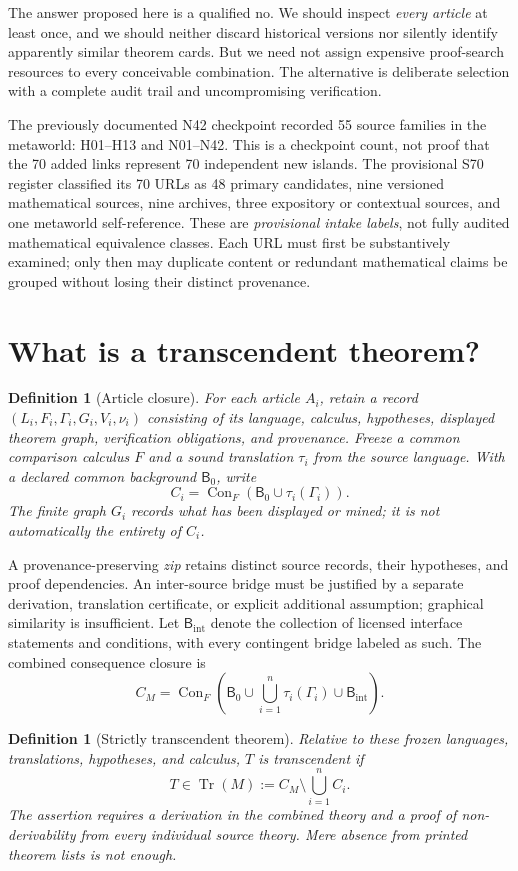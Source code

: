 \documentclass[11pt,letterpaper]{article}
\newtheorem{definition}[theorem]{Definition}
\newcommand{\Con}{\operatorname{Con}}
\newcommand{\Tr}{\operatorname{Tr}}
\newcommand{\B}{\mathsf{B}}
\begin{document}
The answer proposed here is a qualified no. We should inspect \emph{every article} at least once, and we should neither discard historical versions nor silently identify apparently similar theorem cards. But we need not assign expensive proof-search resources to every conceivable combination. The alternative is deliberate selection with a complete audit trail and uncompromising verification.

The previously documented N42 checkpoint recorded 55 source families in the metaworld: H01--H13 and N01--N42. This is a checkpoint count, not proof that the 70 added links represent 70 independent new islands. The provisional S70 register classified its 70 URLs as 48 primary candidates, nine versioned mathematical sources, nine archives, three expository or contextual sources, and one metaworld self-reference. These are \emph{provisional intake labels}, not fully audited mathematical equivalence classes. Each URL must first be substantively examined; only then may duplicate content or redundant mathematical claims be grouped without losing their distinct provenance.

\section{What is a transcendent theorem?}
\begin{definition}[Article closure]
For each article $A_i$, retain a record $(L_i,F_i,\Gamma_i,G_i,V_i,\nu_i)$ consisting of its language, calculus, hypotheses, displayed theorem graph, verification obligations, and provenance. Freeze a common comparison calculus $F$ and a sound translation $\tau_i$ from the source language. With a declared common background $\B_0$, write
\[
C_i=\Con_F(\B_0\cup\tau_i(\Gamma_i)).
\]
The finite graph $G_i$ records what has been displayed or mined; it is not automatically the entirety of $C_i$.
\end{definition}

A provenance-preserving \emph{zip} retains distinct source records, their hypotheses, and proof dependencies. An inter-source bridge must be justified by a separate derivation, translation certificate, or explicit additional assumption; graphical similarity is insufficient. Let $\B_{\mathrm{int}}$ denote the collection of licensed interface statements and conditions, with every contingent bridge labeled as such. The combined consequence closure is
\[
C_M=\Con_F\left(\B_0\cup\bigcup_{i=1}^n\tau_i(\Gamma_i)\cup\B_{\mathrm{int}}\right).
\]
\begin{definition}[Strictly transcendent theorem]
Relative to these frozen languages, translations, hypotheses, and calculus, $T$ is \emph{transcendent} if
\[
\boxed{T\in \Tr(M):=C_M\setminus\bigcup_{i=1}^n C_i.}
\]
The assertion requires a derivation in the combined theory and a proof of non-derivability from \emph{every} individual source theory. Mere absence from printed theorem lists is not enough.
\end{definition}
\end{document}
